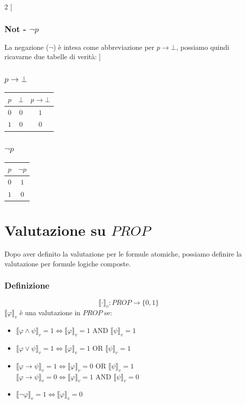 \documentclass[a4paper,12pt]{report}
\newcommand\val[1]{\llbracket#1\rrbracket}
\newcommand\Iff{\Leftrightarrow}
\begin{document}
\begin{multicols}{2}
[
\subsubsection{Not - $\neg p$}
La negazione ($\neg$) \`{e} intesa come abbreviazione per $p \to \bot$, possiamo quindi ricavarne due tabelle di verit\`{a}:
]
\subsubsection{$p \to \bot$}
\begin{tabular}{c c | c}
$p$ & $\bot$ & $p \to \bot$ \\
\hline
$0$ & $0$ & $1$ \\
$1$ & $0$ & $0$ 
\end{tabular}
\subsubsection{$\neg p$}
\begin{tabular}{c | c}
$p$ & $\neg p$ \\
\hline
$0$ & $1$ \\
$1$ & $0$ 
\end{tabular}
\end{multicols}

\section{Valutazione su $PROP$}
Dopo aver definito la valutazione per le formule atomiche, possiamo definire la valutazione per formule logiche composte.
\subsubsection{Definizione}
\[ \val{ \cdot }_v: PROP \to \{0, 1\} \]
$\val{\varphi}_v$ \`{e} una valutazione in $PROP$ se:
\begin{itemize}
\item $\val{\varphi \wedge \psi}_v = 1 \Iff \val{\varphi}_v = 1 \text{ AND } \val{\psi}_v = 1$
\item $\val{\varphi \lor \psi}_v = 1 \Iff \val{\varphi}_v = 1 \text{ OR } \val{\psi}_v = 1$
\item $\val{\varphi \to \psi}_v = 1 \Iff \val{\varphi}_v = 0 \text{ OR } \val{\psi}_v = 1$ \\
$\val{\varphi \to \psi}_v = 0 \Iff \val{\varphi}_v = 1 \text{ AND } \val{\psi}_v = 0$
\item $\val{\neg\varphi}_v = 1 \Iff \val{\varphi}_v = 0$
\end{itemize}
\end{document}
